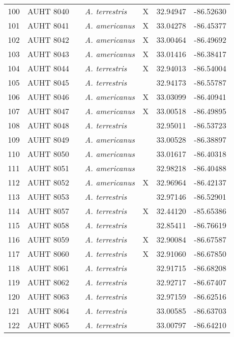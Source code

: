 \begin{longtable}{ lllllll }
100 & AUHT 8040 &  & \textit{A. terrestris} & X & 32.94947 & -86.52630 \\ 
101 & AUHT 8041 &  & \textit{A. americanus} & X & 33.04278 & -86.45377 \\ 
102 & AUHT 8042 &  & \textit{A. americanus} & X & 33.00464 & -86.49692 \\ 
103 & AUHT 8043 &  & \textit{A. americanus} & X & 33.01416 & -86.38417 \\ 
104 & AUHT 8044 &  & \textit{A. terrestris} & X & 32.94013 & -86.54004 \\ 
105 & AUHT 8045 &  & \textit{A. terrestris} &  & 32.94173 & -86.55787 \\ 
106 & AUHT 8046 &  & \textit{A. americanus} & X & 33.03099 & -86.40941 \\ 
107 & AUHT 8047 &  & \textit{A. americanus} & X & 33.00518 & -86.49895 \\ 
108 & AUHT 8048 &  & \textit{A. terrestris} &  & 32.95011 & -86.53723 \\ 
109 & AUHT 8049 &  & \textit{A. americanus} &  & 33.00528 & -86.38897 \\ 
110 & AUHT 8050 &  & \textit{A. americanus} &  & 33.01617 & -86.40318 \\ 
111 & AUHT 8051 &  & \textit{A. americanus} &  & 32.98218 & -86.40488 \\ 
112 & AUHT 8052 &  & \textit{A. americanus} & X & 32.96964 & -86.42137 \\ 
113 & AUHT 8053 &  & \textit{A. terrestris} &  & 32.97146 & -86.52901 \\ 
114 & AUHT 8057 &  & \textit{A. terrestris} & X & 32.44120 & -85.65386 \\ 
115 & AUHT 8058 &  & \textit{A. terrestris} &  & 32.85411 & -86.76619 \\ 
116 & AUHT 8059 &  & \textit{A. terrestris} & X & 32.90084 & -86.67587 \\ 
117 & AUHT 8060 &  & \textit{A. terrestris} & X & 32.91060 & -86.67850 \\ 
118 & AUHT 8061 &  & \textit{A. terrestris} &  & 32.91715 & -86.68208 \\ 
119 & AUHT 8062 &  & \textit{A. terrestris} &  & 32.92717 & -86.67407 \\ 
120 & AUHT 8063 &  & \textit{A. terrestris} &  & 32.97159 & -86.62516 \\ 
121 & AUHT 8064 &  & \textit{A. terrestris} &  & 33.00585 & -86.63703 \\ 
122 & AUHT 8065 &  & \textit{A. terrestris} &  & 33.00797 & -86.64210 \\ 

\end{longtable}
